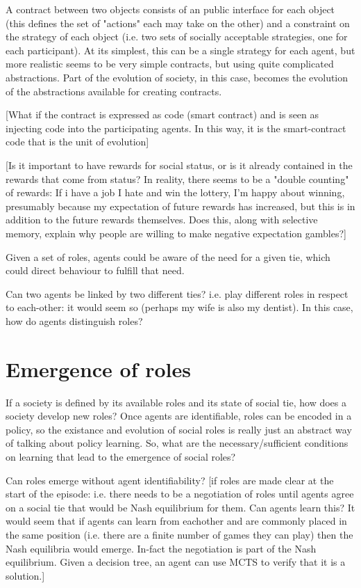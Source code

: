 \documentclass[a4paper]{article}
\begin{document}
A contract between two objects consists of an public interface for each object (this defines the set of "actions" each may take on the other) and a constraint on the strategy of each object (i.e. two sets of socially acceptable strategies, one for each participant). At its simplest, this can be a single strategy for each agent, but more realistic seems to be very simple contracts, but using quite complicated abstractions. Part of the evolution of society, in this case, becomes the evolution of the abstractions available for creating contracts.

[What if the contract is expressed as code (smart contract) and is seen as injecting code into the participating agents. In this way, it is the smart-contract code that is the unit of evolution]

[Is it important to have rewards for social status, or is it already contained in the rewards that come from status? In reality, there seems to be a "double counting" of rewards: If i have a job I hate and win the lottery, I'm happy about winning, presumably because my expectation of future rewards has increased, but this is in addition to the future rewards themselves. Does this, along with selective memory, explain why people are willing to make negative expectation gambles?]

Given a set of roles, agents could be aware of the need for a given tie, which could direct behaviour to fulfill that need.

Can two agents be linked by two different ties? i.e. play different roles in respect to each-other: it would seem so (perhaps my wife is also my dentist). In this case, how do agents distinguish roles?

\section{Emergence of roles}

If a society is defined by its available roles and its state of social tie, how does a society develop new roles? Once agents are identifiable, roles can be encoded in a policy, so the existance and evolution of social roles is really just an abstract way of talking about policy learning. So, what are the necessary/sufficient conditions on learning that lead to the emergence of social roles?

Can roles emerge without agent identifiability? [if roles are made clear at the start of the episode: i.e. there needs to be a negotiation of roles until agents agree on a social tie that would be Nash equilibrium for them. Can agents learn this? It would seem that if agents can learn from eachother and are commonly placed in the same position (i.e. there are a finite number of games they can play) then the Nash equilibria would emerge. In-fact the negotiation is part of the Nash equilibrium. Given a decision tree, an agent can use MCTS to verify that it is a solution.]
\end{document}
